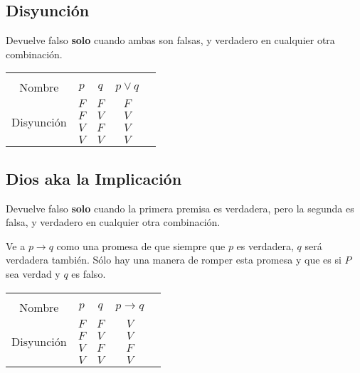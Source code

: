 \documentclass[12pt, fleqn]{report}                             %
\theoremstyle{break}                                            %
\begin{document}
            \subsection{Disyunción}

                Devuelve falso \textbf{solo} cuando ambas son falsas, y verdadero en cualquier
                otra combinación.\\

                \begin{tabular}{ |c|c|c|c|c| } 
                    \hline &&&\\
                    \large{Nombre} & $p$ & $q$ & $p \lor q$ \\[0.5em]
                    \hline
                    \multirow{4}{5em}{Disyunción}
                    & $F$ & $F$ & $F$ \\ \cline{2-4}
                    & $F$ & $V$ & $V$ \\ \cline{2-4}
                    & $V$ & $F$ & $V$ \\ \cline{2-4}
                    & $V$ & $V$ & $V$ \\ 
                    \hline
                \end{tabular}





            \clearpage
            \subsection{Dios aka la Implicación}

                Devuelve falso \textbf{solo} cuando la primera premisa es verdadera, pero la 
                segunda es falsa, y verdadero en cualquier otra combinación.

                Ve a $p \to q$ como una promesa de que siempre que $p$ es verdadera, $q$ será verdadera también.
                Sólo hay una manera de romper esta promesa y que es si $P$ sea verdad y $q$ es falso.\\


                \begin{tabular}{ |c|c|c|c|c| } 
                    \hline &&&\\
                    \large{Nombre} & $p$ & $q$ & $p \to q$ \\[0.5em]
                    \hline
                    \multirow{4}{5em}{Disyunción}
                    & $F$ & $F$ & $V$ \\ \cline{2-4}
                    & $F$ & $V$ & $V$ \\ \cline{2-4}
                    & $V$ & $F$ & $F$ \\ \cline{2-4}
                    & $V$ & $V$ & $V$ \\ 
                    \hline
                \end{tabular}\\[1.0em]
\end{document}
